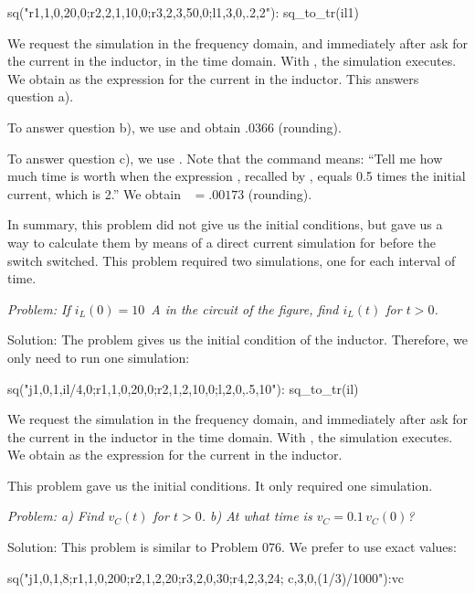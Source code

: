 \begin{entry}
sq\fd("r1,1,0,20,0;r2,2,1,10,0;r3,2,3,50,0;l1,3,0,.2,2"):
sq\fd_to_tr(il1)
\end{entry}

We request the simulation in the frequency domain, and immediately
after ask for the current in the inductor, in the time domain. With
, the simulation executes. We obtain
 as the expression for the current in the
inductor. This answers question a).

To answer question b), we use  and obtain
.0366 (rounding).

To answer question c), we use . Note that
the command means: ``Tell me how much time is worth when the
expression , recalled by , equals
0.5 times the initial current, which is 2.'' We obtain
~$= .00173$ (rounding).

In summary, this problem did not give us the initial conditions, but
gave us a way to calculate them by means of a direct current
simulation for before the switch switched. This problem required two
simulations, one for each interval of time.


\emph{Problem: If $i_L(0) = 10$~A in the circuit of the figure, find
$i_L(t)$ for $t > 0$.}

Solution: The problem gives us the initial condition of the
inductor. Therefore, we only need to run one simulation:

\begin{entry}
sq\fd("j1,0,1,il/4,0;r1,1,0,20,0;r2,1,2,10,0;l,2,0,.5,10"):
sq\fd_to_tr(il)
\end{entry}

We request the simulation in the frequency domain, and immediately
after ask for the current in the inductor in the time domain. With
, the simulation executes. We obtain
 as the expression for the current in the
inductor.

This problem gave us the initial conditions. It only required one
simulation.


\emph{Problem: a) Find $v_C(t)$ for $t > 0$. b) At what time is
$v_C = 0.1\,v_C(0)$?}

Solution: This problem is similar to Problem 076. We prefer to use
exact values:

\begin{entry}
sq\dc("j1,0,1,8;r1,1,0,200;r2,1,2,20;r3,2,0,30;r4,2,3,24;
      c,3,0,(1/3)/1000"):vc
\end{entry}

